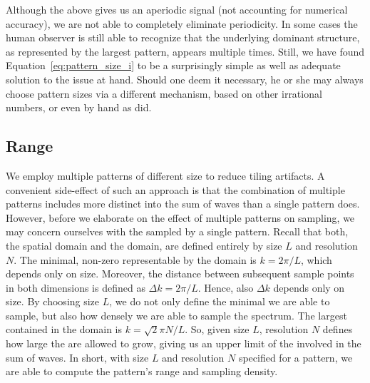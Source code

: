 Although the above gives us an aperiodic signal (not accounting for numerical
accuracy), we are not able to completely eliminate periodicity. In some cases
the human observer is still able to recognize that the underlying dominant
structure, as represented by the largest pattern, appears multiple times.
Still, we have found Equation~\ref{eq:pattern_size_i} to be a surprisingly
simple as well as adequate solution to the issue at hand.
Should one deem it necessary, he or she may always choose pattern
sizes via a different mechanism, based on other irrational numbers, or even by
hand as \citeauthor{article:whitecaps} did.

\subsection{\Wavenumber Range}
%
We employ multiple patterns of different size to reduce tiling artifacts. A
convenient side-effect of such an approach is that the combination of multiple
patterns includes more distinct \wavenumbers into the sum of waves than a single
pattern does. However, before we elaborate on the effect of
multiple patterns on \wavenumber sampling, we may concern ourselves with the
\wavenumbers sampled by a single pattern.
Recall that both, the spatial domain and the \wavevector domain, are defined
entirely by size $L$ and resolution $N$. The minimal, non-zero \wavenumber
representable by the \wavevector domain is $k = 2\pi/L$, which depends only on
size. Moreover, the distance between subsequent
sample points in both dimensions is defined as $\Delta k = 2\pi/L$.
Hence, also $\Delta k$ depends only on size. By choosing size $L$, we do
not only define the minimal \wavenumber we are able to sample, but also
how densely we are able to sample the spectrum. The largest \wavenumber contained
in the \wavevector domain is $k = \sqrt{2}\pi N/L$. So, given size $L$,
resolution $N$ defines how large the \wavenumbers are allowed to grow, giving us
an upper limit of the \wavenumbers involved in the sum of waves. In short, with
size $L$ and resolution $N$ specified for a pattern, we are able to compute the
pattern's \wavenumber range and sampling density.
%
